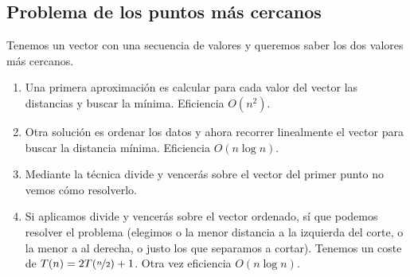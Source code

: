 \subsection{Problema de los puntos más cercanos}
\begin{ejercicio*}
    Tenemos un vector con una secuencia de valores y queremos saber los dos valores más cercanos.

    \begin{enumerate}
        \item Una primera aproximación es calcular para cada valor del vector las distancias y buscar la mínima. Eficiencia $O(n^2)$.
        \item Otra solución es ordenar los datos y ahora recorrer linealmente el vector para buscar la distancia mínima. Eficiencia $O(n\log n)$.
        \item Mediante la técnica divide y vencerás sobre el vector del primer punto no vemos cómo resolverlo.
        \item Si aplicamos divide y vencerás sobre el vector ordenado, sí que podemos resolver el problema (elegimos o la menor distancia a la izquierda del corte, o la menor a al derecha, o justo los que separamos a cortar). Tenemos un coste de $T(n) = 2T(\nicefrac{n}{2})+1$. Otra vez eficiencia $O(n\log n)$.
    \end{enumerate}
\end{ejercicio*}

